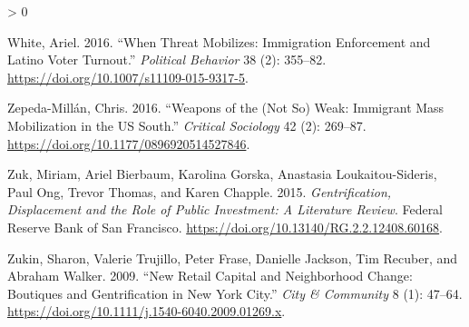 \documentclass[
  12pt,
]{article}
\newlength{\cslhangindent}
\newenvironment{CSLReferences}[2] %
 {%
  \setlength{\parindent}{0pt}
  \ifodd #1 \everypar{\setlength{\hangindent}{\cslhangindent}}\ignorespaces\fi
  \ifnum #2 > 0
  \setlength{\parskip}{#2\baselineskip}
  \fi
 }%
 {}
\begin{document}
\begin{CSLReferences}{1}{0}
\leavevmode\hypertarget{ref-White2016}{}%
White, Ariel. 2016. {``When {Threat Mobilizes}: {Immigration Enforcement} and {Latino Voter Turnout}.''} \emph{Political Behavior} 38 (2): 355--82. \url{https://doi.org/10.1007/s11109-015-9317-5}.

\leavevmode\hypertarget{ref-Zepeda-Millan2016}{}%
Zepeda-Millán, Chris. 2016. {``Weapons of the ({Not So}) {Weak}: {Immigrant Mass Mobilization} in the {US South}.''} \emph{Critical Sociology} 42 (2): 269--87. \url{https://doi.org/10.1177/0896920514527846}.

\leavevmode\hypertarget{ref-Zuk2015}{}%
Zuk, Miriam, Ariel Bierbaum, Karolina Gorska, Anastasia Loukaitou-Sideris, Paul Ong, Trevor Thomas, and Karen Chapple. 2015. \emph{Gentrification, {Displacement} and the {Role} of {Public Investment}: {A Literature Review}}. {Federal Reserve Bank of San Francisco}. \url{https://doi.org/10.13140/RG.2.2.12408.60168}.

\leavevmode\hypertarget{ref-Zukin2009}{}%
Zukin, Sharon, Valerie Trujillo, Peter Frase, Danielle Jackson, Tim Recuber, and Abraham Walker. 2009. {``New {Retail Capital} and {Neighborhood Change}: {Boutiques} and {Gentrification} in {New York City}.''} \emph{City \& Community} 8 (1): 47--64. \url{https://doi.org/10.1111/j.1540-6040.2009.01269.x}.

\end{CSLReferences}
\end{document}
